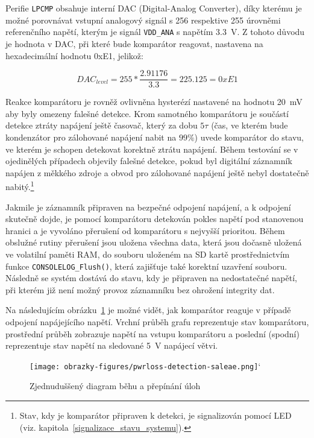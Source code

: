 Perifie \texttt{LPCMP} obsahuje interní DAC (Digital-Analog Converter), díky kterému je možné porovnávat vstupní analogový signál s 256 respektive 255 úrovněmi referenčního napětí, kterým je signál \texttt{VDD\_ANA} s napětím \SI{3.3}{\volt}. Z tohoto důvodu je hodnota v DAC, při které bude komparátor reagovat, nastavena na hexadecimální hodnotu 0xE1, jelikož:

\begin{equation}
    DAC_{level} = 255 * \frac{2.91176}{3.3} = 225.125 = 0xE1
    \label{eq:dac-value}
\end{equation}

Reakce komparátoru je rovněž ovlivněna hysterézí nastavené na hodnotu \SI{20}{\milli\volt} aby byly omezeny falešné detekce. Krom samotného komparátoru je součástí detekce ztráty napájení ještě časovač, který za dobu $5\tau$ (čas, ve kterém bude kondenzátor pro zálohované napájení nabit na $99\%$) uvede komparátor do stavu, ve kterém je schopen detekovat korektně ztrátu napájení. Během testování se v ojedinělých případech objevily falešné detekce, pokud byl digitální záznamník napájen z měkkého zdroje a obvod pro zálohované napájení ještě nebyl dostatečně nabitý.\footnote{Stav, kdy je komparátor připraven k detekci, je signalizován pomocí LED (viz. kapitola~\ref{signalizace_stavu_systemu}).}

Jakmile je záznamník připraven na bezpečné odpojení napájení, a k odpojení skutečně dojde, je pomocí komparátoru detekován pokles napětí pod stanovenou hranici a je vyvoláno přerušení od komparátoru s nejvyšší prioritou. Během obslužné rutiny přerušení jsou uložena všechna data, která jsou dočasně uložená ve volatilní paměti RAM, do souboru uloženém na SD kartě prostřednictvím funkce \texttt{CONSOLELOG\_Flush()}, která zajišťuje také korektní uzavření souboru. Následně se systém dostává do stavu, kdy je připraven na nedostatečné napětí, při kterém již není možný provoz záznamníku bez ohrožení integrity dat.

Na následujícím obrázku~\ref{fig:pwrloss-detection-saleae} je možné vidět, jak komparátor reaguje v případě odpojení napájejícího napětí. Vrchní průběh grafu reprezentuje stav komparátoru, prostřední průběh zobrazuje napětí na vstupu komparátoru a poslední (spodní) reprezentuje stav napětí na sledované \SI{5}{\volt} napájecí větvi.

\begin{figure}[h]
    \centering
    \texttt{[image: obrazky-figures/pwrloss-detection-saleae.png]}`
    
    \caption{Zjednuduššený diagram běhu a přepínání úloh}
    \label{fig:pwrloss-detection-saleae}
\end{figure}

